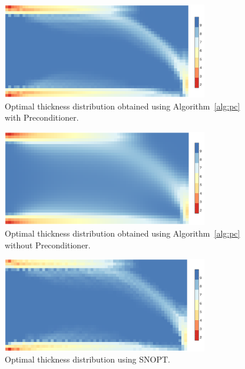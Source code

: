 \begin{figure}[tbp]
  \begin{center}
    \includegraphics*[width=0.8\textwidth]{./figs/chap6_fstopo/medium_thickness_color.pdf}%
    \caption{Optimal thickness distribution obtained using Algorithm~\ref{alg:pc} with Preconditioner.
      \label{fig:thick}}
  \end{center}
\end{figure}

\begin{figure}[tbp]
  \begin{center}
    \includegraphics*[width=0.8\textwidth]{./figs/chap6_fstopo/medium_eye_thickness_color.pdf}%
    \caption{Optimal thickness distribution obtained using Algorithm~\ref{alg:pc} without Preconditioner.
      \label{fig:thick_eye}}
  \end{center}
\end{figure}

\begin{figure}[tbp]
  \begin{center}
    \includegraphics*[width=0.8\textwidth]{./figs/chap6_fstopo/medium_thickness_snopt2.pdf}%
    \caption{Optimal thickness distribution using SNOPT.
      \label{fig:thick_snopt}}
  \end{center}
\end{figure}

